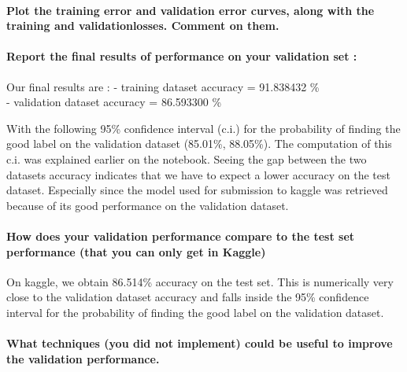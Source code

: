 \documentclass[11pt]{article}
\begin{document}
\paragraph{Plot the training error and validation error curves, along
with the training and validationlosses. Comment on
them.}\label{plot-the-training-error-and-validation-error-curves-along-with-the-training-and-validationlosses.-comment-on-them.}

\paragraph{Report the final results of performance on your validation
set
:}\label{report-the-final-results-of-performance-on-your-validation-set}

Our final results are : - training dataset accuracy = 91.838432 \%\\
- validation dataset accuracy = 86.593300 \%

With the following 95\% confidence interval (c.i.) for the probability
of finding the good label on the validation dataset (85.01\%, 88.05\%).
The computation of this c.i. was explained earlier on the notebook.
Seeing the gap between the two datasets accuracy indicates that we have
to expect a lower accuracy on the test dataset. Especially since the
model used for submission to kaggle was retrieved because of its good
performance on the validation dataset.

\paragraph{How does your validation performance compare to the test set
performance (that you can only get in
Kaggle)}\label{how-does-your-validation-performance-compare-to-the-test-set-performance-that-you-can-only-get-in-kaggle}

On kaggle, we obtain 86.514\% accuracy on the test set. This is
numerically very close to the validation dataset accuracy and falls
inside the 95\% confidence interval for the probability of finding the
good label on the validation dataset.

\paragraph{What techniques (you did not implement) could be useful to
improve the validation
performance.}\label{what-techniques-you-did-not-implement-could-be-useful-to-improve-the-validation-performance.}
\end{document}
